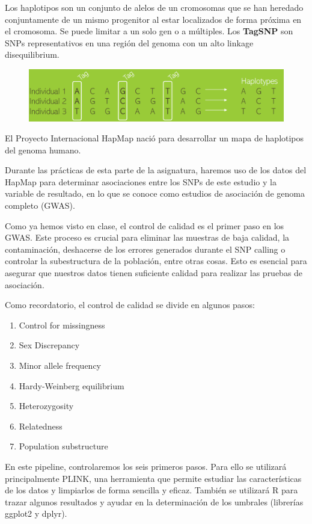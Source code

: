Los haplotipos son un conjunto de alelos de un cromosomas que se han heredado conjuntamente de un mismo progenitor al estar localizados de forma próxima en el cromosoma. Se puede limitar a un solo gen o a múltiples. Los \textbf{TagSNP} son SNPs representativos en una región del genoma con un alto linkage disequilibrium. 

\begin{figure}[htbp]
\centering
\includegraphics[width = \textwidth]{figs/tagsnp.png}
\end{figure}

El Proyecto Internacional HapMap nació para desarrollar un mapa de haplotipos del genoma humano. 

Durante las prácticas de esta parte de la asignatura, haremos uso de los datos del HapMap para determinar asociaciones entre los SNPs de este estudio y la variable de resultado, en lo que se conoce como estudios de asociación de genoma completo (GWAS).

Como ya hemos visto en clase, el control de calidad es el primer paso en los GWAS. Este proceso es crucial para eliminar las muestras de baja calidad, la contaminación, deshacerse de los errores generados durante el SNP calling o controlar la subestructura de la población, entre otras cosas. Esto es esencial para asegurar que nuestros datos tienen suficiente calidad para realizar las pruebas de asociación.

Como recordatorio, el control de calidad se divide en algunos pasos:
\begin{enumerate}
\item Control for missingness
\item Sex Discrepancy
\item Minor allele frequency
\item Hardy-Weinberg equilibrium
\item Heterozygosity
\item Relatedness
\item Population substructure
\end{enumerate}

En este pipeline, controlaremos los seis primeros pasos. Para ello se utilizará principalmente PLINK, una herramienta que permite estudiar las características de los datos y limpiarlos de forma sencilla y eficaz. También se utilizará R para trazar algunos resultados y ayudar en la determinación de los umbrales (librerías ggplot2 y dplyr).

